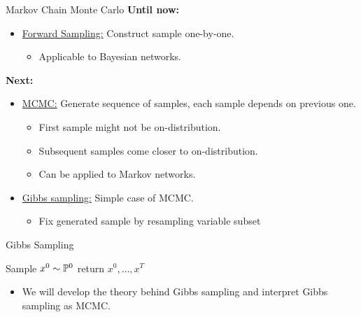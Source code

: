 \begin{frame}{Markov Chain Monte Carlo}
    \textbf{Until now:}
\begin{itemize}
    \item \underline{Forward Sampling:} Construct sample one-by-one.
    \begin{itemize}
        \pause \item Applicable to Bayesian networks.
    \end{itemize}
\end{itemize}
\pause
\textbf{Next:}
\begin{itemize}
    \item \underline{MCMC:} Generate sequence of samples, each sample depends on previous one. 
    \begin{itemize}
        \pause \item First sample might not be on-distribution.
        \pause \item Subsequent samples come closer to on-distribution.
        \pause \item Can be applied to Markov networks.
    \end{itemize}
    \pause \item \underline{Gibbs sampling:} Simple case of MCMC.
    \begin{itemize}
        \pause \item Fix generated sample by resampling variable subset
    \end{itemize}
\end{itemize}

\pause
\begin{algorithm}[H]
    \caption{Gibbs Sampling}
    \label{alg:gibbs-sampling}
        \pause
    Sample $x^0 \sim \Pb^0$\;
    \pause
    return $x^0,\ldots,x^T$\;
\end{algorithm}
\pause
\begin{itemize}
    \item We will develop the theory behind Gibbs sampling and interpret Gibbs sampling as MCMC.
\end{itemize}
\end{frame}

